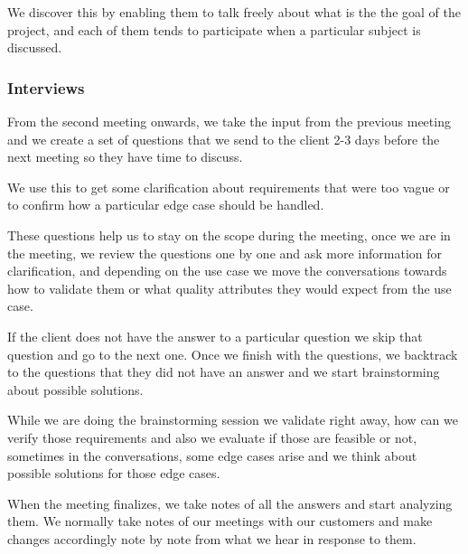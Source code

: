 \noindent We discover this by enabling them to talk freely about what is the 
the goal of the project, and each of them tends to participate when a 
particular subject is discussed. \newline

\pagebreak
\subsubsection{Interviews}
From the second meeting onwards, we take the input from the previous meeting 
and we create a set of questions that we send to the client 2-3 days before 
the next meeting so they have time to discuss. \newline

\noindent We use this to get some clarification about requirements that were 
too vague or to confirm how a particular edge case should be handled. \newline

\noindent These questions help us to stay on the scope during the meeting, 
once we are in the meeting, we review the questions one by one and ask more 
information for clarification, and depending on the use case we move the 
conversations towards how to validate them or what quality 
attributes they would expect from the use case. \newline

\noindent If the client does not have the answer to a particular question we 
skip that question and go to the next one. Once we finish with the questions, 
we backtrack to the questions that they did not have an answer and we start 
brainstorming about possible solutions. \newline

\noindent While we are doing the brainstorming session we validate right 
away, how can we verify those requirements and also we evaluate if those are 
feasible or not, sometimes in the conversations, some edge cases arise and we 
think about possible solutions for those edge cases. \newline

\noindent When the meeting finalizes, we take notes of all the answers and 
start analyzing them. We normally take notes of our meetings with our 
customers and make changes accordingly note by note from what we hear 
in response to them.